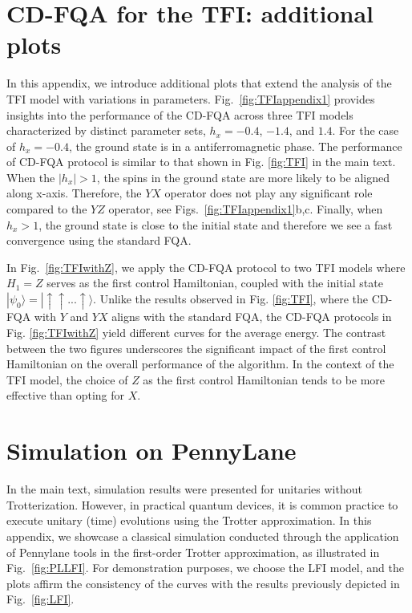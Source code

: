 \documentclass[twocolumn,aps,superscriptaddress,floatfix,longbibliography]{revtex4-2}
\newcommand{\ra}{\rangle}
\def\YX{\ensuremath{\mathit{YX}}\xspace} %
\def\YZ{\ensuremath{\mathit{YZ}}\xspace}
\begin{document}
\section{CD-FQA for the TFI: additional plots}

In this appendix, we introduce additional plots that extend the
analysis of the TFI model with variations in parameters. Fig.~\ref{fig:TFIappendix1} provides insights into the performance of
the CD-FQA across three TFI models characterized by distinct
parameter sets, $h_x=-0.4$, $-1.4$, and $1.4$. For the case of
$h_x=-0.4$, the ground state is in a antiferromagnetic phase.
The performance of CD-FQA protocol is similar to that shown in
Fig. \ref{fig:TFI} in the main text. When the $|h_x|>1$, the
spins in the ground state are more likely to be aligned along
x-axis. Therefore, the \YX operator does not play any
significant role compared to the \YZ operator, see Figs.~\ref{fig:TFIappendix1}b,c. Finally,  when $h_x>1$, the ground
state is close to the initial state and therefore we see a fast
convergence using the standard FQA. 

In Fig.~\ref{fig:TFIwithZ}, we apply the CD-FQA protocol to
two TFI models where $H_1=Z$ serves as the first control
Hamiltonian, coupled with the initial state
$|\psi_0\ra=|\uparrow \uparrow ...\uparrow\ra$. Unlike the
results observed in Fig. \ref{fig:TFI}, where the CD-FQA with
$Y$ and \YX aligns with the standard FQA, the CD-FQA protocols
in Fig. \ref{fig:TFIwithZ} yield different curves for the
average energy. The contrast between the two figures underscores
the significant impact of the first control Hamiltonian on the
overall performance of the algorithm. In the context of the TFI
model, the choice of $Z$ as the first control Hamiltonian tends
to be more effective than opting for $X$. 


\section{Simulation on PennyLane} 

In the main text, simulation results were presented for
unitaries without Trotterization. However, in practical quantum
devices, it is common practice to execute unitary (time)
evolutions using the Trotter approximation. In this appendix, we
showcase a classical simulation conducted through the
application of Pennylane tools in the first-order Trotter
approximation, as illustrated in Fig.~\ref{fig:PLLFI}. For
demonstration purposes, we choose the LFI model, and the plots
affirm the consistency of the curves with the results previously
depicted in Fig.~\ref{fig:LFI}.



%

\end{document}
